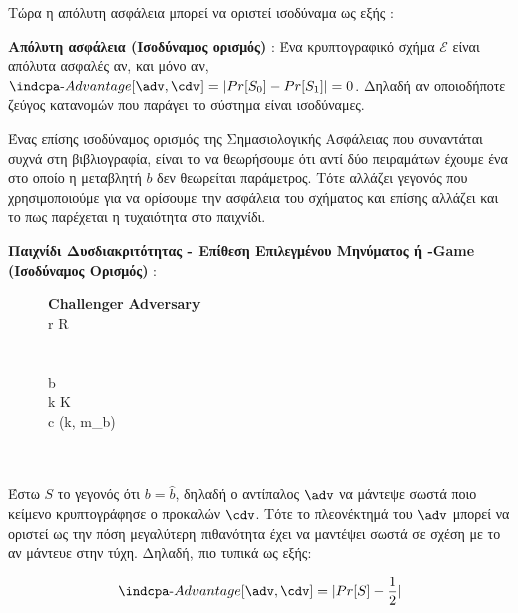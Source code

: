 Τώρα η απόλυτη ασφάλεια μπορεί να οριστεί ισοδύναμα ως εξής :

\begin{definition}
\label{def:perfect_security_1}
\textbf{Απόλυτη ασφάλεια (Ισοδύναμος ορισμός)} : Ένα κρυπτογραφικό σχήμα $\mathcal{E}$ είναι απόλυτα ασφαλές αν, και μόνο αν, $\indcpa\text{-}Advantage[\adv, \cdv] = | Pr[S_0] - Pr[S_1] | = 0$. Δηλαδή αν οποιοδήποτε ζεύγος κατανομών που παράγει το σύστημα είναι ισοδύναμες.
\end{definition}

Ένας επίσης ισοδύναμος ορισμός της Σημασιολογικής Ασφάλειας που συναντάται συχνά στη βιβλιογραφία, είναι το να θεωρήσουμε ότι αντί δύο πειραμάτων έχουμε ένα στο οποίο η μεταβλητή $b$ δεν θεωρείται παράμετρος. Τότε αλλάζει γεγονός που χρησιμοποιούμε για να ορίσουμε την ασφάλεια του σχήματος και επίσης αλλάζει και το πως παρέχεται η τυχαιότητα στο παιχνίδι.

\begin{definition}
\textbf{Παιχνίδι Δυσδιακριτότητας - Επίθεση Επιλεγμένου Μηνύματος ή \indcpa-Game (Ισοδύναμος Ορισμός)} : 
\begin{figure}[H]
\begin{pchstack}
     {
    \textbf{Challenger \cdv} \< \< \textbf{Adversary \adv} \\
    r \sample R \< \< \\
    \<  \< \\
    \<  \< \\
    b \sample \bin \< \< \\
    k \sample K \< \< \\
    c \sample \enc(k, m_b) \< \< \\
    \<  \< \\
    \< \\
    }
\end{pchstack}
\label{def:indcpa_game_2}
\end{figure}

Έστω $S$ το γεγονός ότι $b = \hat{b}$, δηλαδή ο αντίπαλος $\adv$ να μάντεψε σωστά ποιο κείμενο κρυπτογράφησε ο προκαλών $\cdv$. Τότε το πλεονέκτημά του $\adv$ μπορεί να οριστεί ως την πόση μεγαλύτερη πιθανότητα έχει να μαντέψει σωστά σε σχέση με το αν μάντευε στην τύχη. Δηλαδή, πιο τυπικά ως εξής: 

\begin{equation}
    \indcpa\text{-}Advantage[\adv, \cdv] = | Pr[S] - \dfrac{1}{2} |
\end{equation}
\end{definition}


